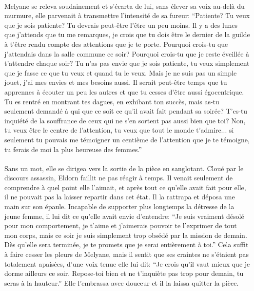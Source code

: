 \paragraph{}
Melyane se releva soudainement et s'écarta de lui, sans élever sa voix au-delà
du murmure, elle parvenait à transmettre l'intensité de sa fureur: ``Patiente?
Tu veux que je sois patiente? Tu devrais peut-être l'être un peu moins. Il y a
des lunes que j'attends que tu me remarques, je crois que tu dois être le
dernier de la guilde à t'être rendu compte des attentions que je te porte.
Pourquoi crois-tu que j'attendais dans la salle commune ce soir? Pourquoi
crois-tu que je reste éveillée à t'attendre chaque soir? Tu n'as pas envie que
je sois patiente, tu veux simplement que je fasse ce que tu veux et quand tu
le veux. Mais je ne suis pas un simple jouet, j'ai mes envies et mes besoins
aussi. Il serait peut-être temps que tu apprennes à écouter un peu les autres
et que tu cesses d'être aussi égocentrique. Tu es rentré en montrant tes
dagues, en exhibant ton succès, mais as-tu seulement demandé à qui que ce soit
ce qu'il avait fait pendant sa soirée? T'es-tu inquiété de la souffrance de
ceux qui ne s'en sortent pas aussi bien que toi? Non, tu veux être le centre
de l'attention, tu veux que tout le monde t'admire... si seulement tu pouvais
me témoigner un centième de l'attention que je te témoigne, tu ferais de moi
la plus heureuse des femmes.''

\paragraph{}
Sans un mot, elle se dirigea vers la sortie de la pièce en sanglotant. Cloué
par le discours assassin, Eldorn faillit ne pas réagir à temps. Il venait
seulement de comprendre à quel point elle l'aimait, et après tout ce qu'elle
avait fait pour elle, il ne pouvait pas la laisser repartir dans cet état. Il
la rattrapa et déposa une main sur son épaule. Incapable de supporter plus
longtemps la détresse de la jeune femme, il lui dit ce qu'elle avait envie
d'entendre: ``Je suis vraiment désolé pour mon comportement, je t'aime et
j'aimerais pouvoir te l'exprimer de tout mon corps, mais ce soir je suis
simplement trop obsédé par la mission de demain. Dès qu'elle sera terminée, je
te promets que je serai entièrement à toi.'' Cela suffit à faire cesser les
pleurs de Melyane, mais il sentit que ses craintes ne s'étaient pas totalement
apaisées, d'une voix tenue elle lui dit: ``Je crois qu'il vaut mieux que je
dorme ailleurs ce soir. Repose-toi bien et ne t'inquiète pas trop pour
demain, tu seras à la hauteur.'' Elle l'embrassa avec douceur et il la laissa
quitter la pièce.

